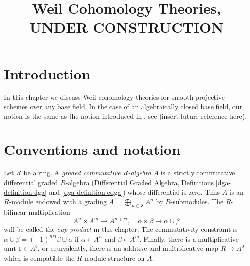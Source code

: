 

%


\title{Weil Cohomology Theories, UNDER CONSTRUCTION}


\maketitle

\label{section-phantom}

\tableofcontents

\section{Introduction}
\label{section-introduction}

\noindent
In this chapter we discuss Weil cohomology theories for smooth
projective schemes over any base field. In the case of an algebraically
closed base field, our notion is the same as the notion introduced
in \cite{Kleiman-cycles}, see (insert future reference here).





\section{Conventions and notation}
\label{section-conventions}

\noindent
Let $R$ be a ring. A {\it graded commutative $R$-algebra} $A$ is a
strictly commutative differential graded $R$-algebra
(Differential Graded Algebra, Definitions \ref{dga-definition-dga} and
\ref{dga-definition-cdga}) whose differential is zero. Thus $A$
is an $R$-module endowed with a grading
$A = \bigoplus_{n \in \mathbf{Z}} A^n$ by
$R$-submodules. The $R$-bilinear multiplication
$$
A^n \times A^m \longrightarrow A^{n + m},\quad
\alpha \times \beta \longmapsto \alpha \cup \beta
$$
will be called the {\it cup product} in this chapter.
The commutativity constraint is
$\alpha \cup \beta = (-1)^{nm} \beta \cup \alpha$ if
$\alpha \in A^n$ and $\beta \in A^m$. Finally, there is
a multiplicative unit $1 \in A^0$, or equivalently, there is an
additive and multiplicative map $R \to A^0$ which is compatible the
$R$-module structure on $A$.

